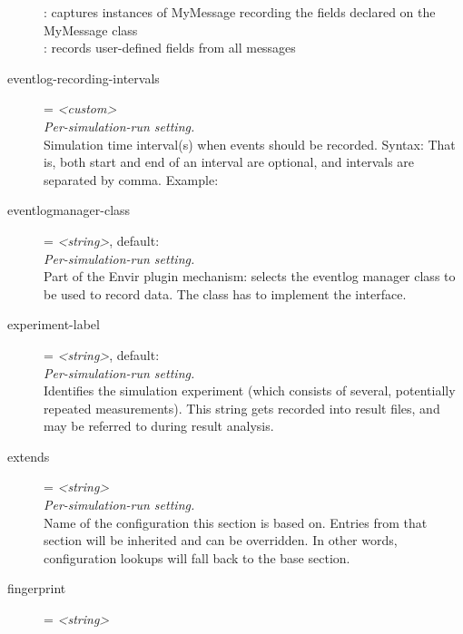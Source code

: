 \begin{description}
    :
    captures instances of MyMessage recording the fields declared on the
    MyMessage class\\
        : records
    user-defined fields from all messages
\item[eventlog-recording-intervals] = \textit{<custom>}\\
    \textit{Per-simulation-run setting.}\\
    Simulation time interval(s) when events should be recorded. Syntax:
     That is,
    both start and end of an interval are optional, and intervals are separated
    by comma. Example: 
\item[eventlogmanager-class] = \textit{<string>}, default: \\
    \textit{Per-simulation-run setting.}\\
    Part of the Envir plugin mechanism: selects the eventlog manager class to
    be used to record data. The class has to implement the
     interface.
\item[experiment-label] = \textit{<string>}, default: \\
    \textit{Per-simulation-run setting.}\\
    Identifies the simulation experiment (which consists of several,
    potentially repeated measurements). This string gets recorded into result
    files, and may be referred to during result analysis.
\item[extends] = \textit{<string>}\\
    \textit{Per-simulation-run setting.}\\
    Name of the configuration this section is based on. Entries from that
    section will be inherited and can be overridden. In other words,
    configuration lookups will fall back to the base section.
\item[fingerprint] = \textit{<string>}\\

\end{description}
